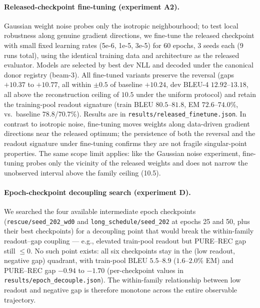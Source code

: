 \documentclass[pdflatex,sn-chicago]{sn-jnl}
\begin{document}
\paragraph{Released-checkpoint fine-tuning (experiment A2).}
Gaussian weight noise probes only the isotropic neighbourhood; to test local robustness along genuine gradient directions, we fine-tune the released checkpoint with small fixed learning rates (5e-6, 1e-5, 3e-5) for 60 epochs, 3 seeds each (9 runs total), using the identical training data and architecture as the released evaluator. Models are selected by best dev NLL and decoded under the canonical donor registry (beam-3). All fine-tuned variants preserve the reversal (gaps $+10.37$ to $+10.77$, all within $\pm 0.5$ of baseline $+10.24$, dev BLEU-4 $12.92$--$13.18$, all above the reconstruction ceiling of $10.5$ under the uniform protocol) and retain the training-pool readout signature (train BLEU $80.5$--$81.8$, EM $72.6$--$74.0\%$, vs.\ baseline $78.8$/$70.7\%$). Results are in \texttt{results/released\_finetune.json}. In contrast to isotropic noise, fine-tuning moves weights along data-driven gradient directions near the released optimum; the persistence of both the reversal and the readout signature under fine-tuning confirms they are not fragile singular-point properties. The same scope limit applies: like the Gaussian noise experiment, fine-tuning probes only the vicinity of the released weights and does not narrow the unobserved interval above the family ceiling (10.5).

\paragraph{Epoch-checkpoint decoupling search (experiment D).}
We searched the four available intermediate epoch checkpoints (\texttt{rescue/seed\_202\_wd0} and \texttt{long\_schedule/seed\_202} at epochs 25 and 50, plus their best checkpoints) for a decoupling point that would break the within-family readout--gap coupling --- e.g., elevated train-pool readout but PURE--REC gap still $\leq 0$. No such point exists: all six checkpoints stay in the (low readout, negative gap) quadrant, with train-pool BLEU $5.5$--$8.9$ ($1.6$--$2.0\%$ EM) and PURE--REC gap $-0.94$ to $-1.70$ (per-checkpoint values in \texttt{results/epoch\_decouple.json}). The within-family relationship between low readout and negative gap is therefore monotone across the entire observable trajectory.
\end{document}
